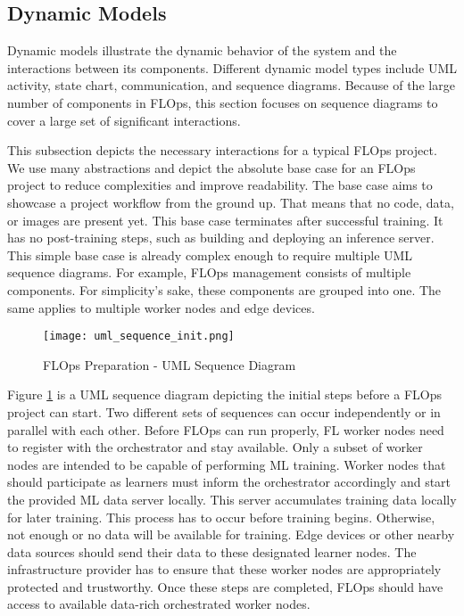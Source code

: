 \subsection{Dynamic Models}
Dynamic models illustrate the dynamic behavior of the system and the interactions between its components.
Different dynamic model types include UML activity, state chart, communication, and sequence diagrams.
Because of the large number of components in FLOps, this section focuses on sequence diagrams to cover a large set of significant interactions.

This subsection depicts the necessary interactions for a typical FLOps project.
We use many abstractions and depict the absolute base case for an FLOps project to reduce complexities and improve readability.
The base case aims to showcase a project workflow from the ground up.
That means that no code, data, or images are present yet.
This base case terminates after successful training.
It has no post-training steps, such as building and deploying an inference server.
This simple base case is already complex enough to require multiple UML sequence diagrams.
For example, FLOps management consists of multiple components.
For simplicity's sake, these components are grouped into one. 
The same applies to multiple worker nodes and edge devices.

\begin{figure}[h]
    \begin{adjustwidth}{-0.1\paperwidth}{-0.1\paperwidth}
        \centering
        \texttt{[image: uml\_sequence\_init.png]}
        \caption{FLOps Preparation - UML Sequence Diagram}
        \label{fig:uml_sequence_init}
    \end{adjustwidth}
\end{figure}

Figure \ref{fig:uml_sequence_init} is a UML sequence diagram depicting the initial steps before a FLOps project can start.
Two different sets of sequences can occur independently or in parallel with each other.
Before FLOps can run properly, FL worker nodes need to register with the orchestrator and stay available.
Only a subset of worker nodes are intended to be capable of performing ML training.
Worker nodes that should participate as learners must inform the orchestrator accordingly and start the provided ML data server locally.
This server accumulates training data locally for later training.
This process has to occur before training begins.
Otherwise, not enough or no data will be available for training.
Edge devices or other nearby data sources should send their data to these designated learner nodes.
The infrastructure provider has to ensure that these worker nodes are appropriately protected and trustworthy.
Once these steps are completed, FLOps should have access to available data-rich orchestrated worker nodes.

